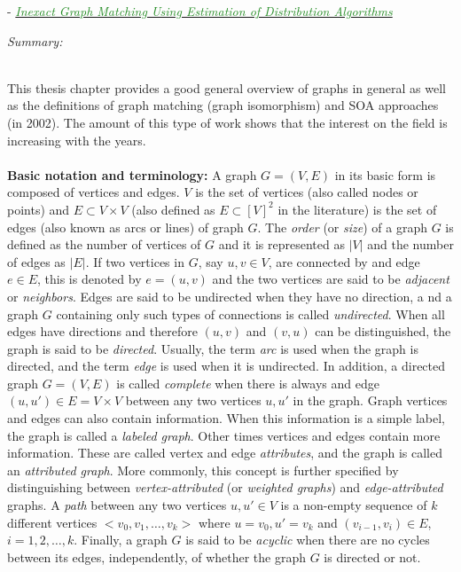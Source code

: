 \documentclass[]{article}
\newcommand{\paperentry}[4]{
            \hangindent=1cm
            \textcolor{red}{\cite{#1}} - \href{run:../References/#3}{\textcolor{ForestGreen}{\textit{#2}}}
            
            \noindent            
            \begin{minipage}[t]{0.1\linewidth}\hfill\end{minipage}
            \begin{minipage}[t]{0.8\linewidth}\textcolor{NavyBlue}{{\textit{Summary:}}}#4\end{minipage}
            \vspace{.25cm}
          }
\begin{document}
		\paperentry{Bengoetxea2002ThesisGraphMatching}
		{Inexact Graph Matching Using Estimation of Distribution Algorithms}
		{Manifold_Representation_Learning/Alignment/Bengoetxea2002ThesisGraphMatching.pdf}
		{}\\
		This thesis chapter provides a good general overview of graphs in general as well as the definitions of graph matching (graph isomorphism) and SOA approaches (in 2002).  The amount of this type of work shows that the interest on the field is increasing with the years.
		\\ \\
		\textbf{Basic notation and terminology:} A graph $G = (V,E)$ in its basic form is composed of vertices and edges.  $V$ is the set of vertices (also called nodes or points) and $E \subset V \times V$ (also defined as $E \subset [V]^{2}$ in the literature) is the set of edges (also known as arcs or lines) of graph $G$.  The \textit{order} (or \textit{size}) of a graph $G$ is defined as the number of vertices of $G$ and it is represented as $|V|$ and the number of edges as $|E|$.  If two vertices in $G$, say $u,v \in V$, are connected by and edge $e \in E$, this is denoted by $e=(u,v)$ and the two vertices are said to be \textit{adjacent} or \textit{neighbors}.  Edges are said to be undirected when they have no direction, a nd a graph $G$ containing only such types of connections is called \textit{undirected}.  When all edges have directions and therefore $(u,v)$ and $(v,u)$ can be distinguished, the graph is said to be \textit{directed}.  Usually, the term \textit{arc} is used when the graph is directed, and the term \textit{edge} is used when it is undirected.  In addition, a directed graph $G=(V,E)$ is called \textit{complete} when there is always and edge $(u,u')\in E = V \times V$ between any two vertices $u, u'$ in the graph.  Graph vertices and edges can also contain information.  When this information is a simple label, the graph is called a \textit{labeled graph}.  Other times vertices and edges contain more information.  These are called vertex and edge \textit{attributes}, and the graph is called an \textit{attributed graph}.  More commonly, this concept is further specified by distinguishing between \textit{vertex-attributed} (or \textit{weighted graphs}) and \textit{edge-attributed} graphs.  A \textit{path} between any two vertices $u,u'  \in V$ is a non-empty sequence of $k$ different vertices $<v_{0}, v_{1}, \dots, v_{k}>$ where $u=v_{0}, u'=v_{k}$ and $(v_{i-1},v_{i})\in E$, $i=1,2,\dots,k$.  Finally, a graph $G$ is said to be \textit{acyclic} when there are no cycles between its edges, independently, of whether the graph $G$ is directed or not.  
\end{document}
